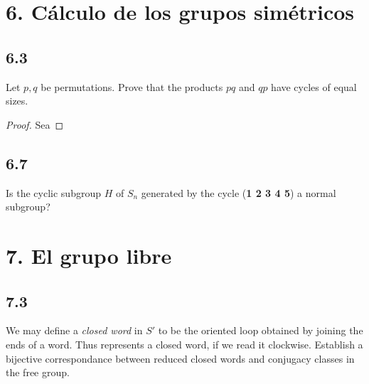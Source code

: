 \documentclass[11pt]{article}
\theoremstyle{definition}
\begin{document}
        \section{6. Cálculo de los grupos simétricos}
        \subsection{6.3}
        Let $p,q$ be permutations. Prove that the products $pq$ and $qp$ have cycles of equal sizes.
        \begin{proof}
            Sea 
        \end{proof}
        \subsection{6.7}
        Is the cyclic subgroup $H$ of $S_n$ generated by the cycle (\textbf{1 2 3 4 5}) a normal subgroup?

        \section{7. El grupo libre}
        \subsection{7.3}
        We may define a \textit{closed word} in $S'$ to be the oriented loop obtained by joining the ends of a word. Thus %
        represents a closed word, if we read it clockwise. Establish a bijective correspondance between reduced closed words and conjugacy classes in the free group.
    
\end{document}
